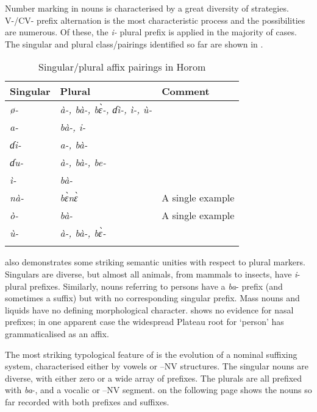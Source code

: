 \documentclass[output=paper]{langsci/langscibook}
\begin{document}
Number marking in  nouns is characterised by a great diversity of strategies. V-/CV- prefix alternation is the most characteristic process and the possibilities are numerous. Of these, the \textit{i-} plural prefix is applied in the majority of cases. The singular and plural class/pairings identified so far are shown in .

\begin{table}
\caption{\label{tab:nomaffplat:17} Singular/plural affix pairings in Horom}
\begin{tabularx}{\textwidth}{XXl}
\lsptoprule
  Singular 	&   Plural 	&   Comment\\
  \midrule
\itshape ø- 	& \itshape à-, bà-, bɛ̀-, ɗì-, ì-, ù- 	& \\
\itshape a- 	& \itshape bà-, i- 	& \\
\itshape ɗi- 	& \itshape a-, bà- 	& \\
\itshape ɗu- 	& \itshape à-, bà-, be- 	& \\
\itshape ì- 	& \itshape bà- 	& \\
\itshape nà- 	& \itshape bɛ̀nɛ̀ 	&  A single example\\
\itshape ò- 	& \itshape bà- 	&  A single example\\
\itshape ù- 	& \itshape à-, bà-,  bɛ̀- 	& \\
\lspbottomrule
\end{tabularx}
\end{table}
 
 also demonstrates some striking semantic unities with respect to plural markers. Singulars are diverse, but almost all animals, from mammals to insects, have \textit{i}- plural prefixes. Similarly, nouns referring to persons have a \textit{ba}- prefix (and sometimes a suffix) but with no corresponding singular prefix. Mass nouns and liquids have no defining morphological character.  shows no evidence for nasal prefixes; in one apparent case the widespread Plateau root for ‘person’ has grammaticalised as an affix.

The most striking typological feature of  is the evolution of a nominal suffixing system, characterised either by vowels or –NV structures. The singular nouns are diverse, with either zero or a wide array of prefixes. The plurals are all prefixed with \textit{ba}-, and a vocalic or –NV segment.  on the following page shows the nouns so far recorded with both prefixes and suffixes. 
\end{document}

